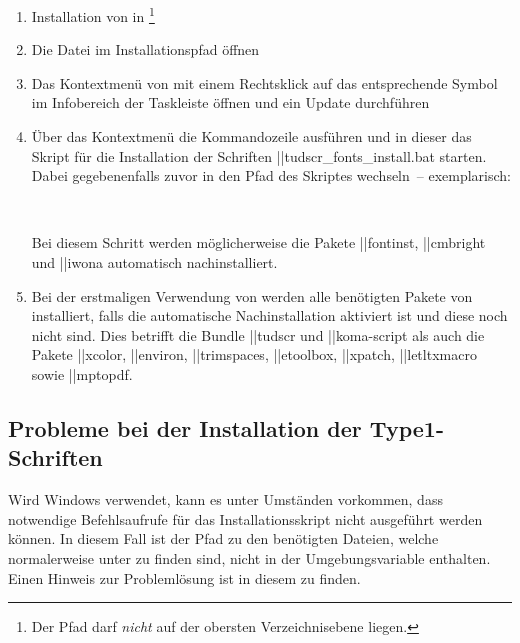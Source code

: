 %
\begin{enumerate}
\item Installation von  in 
  \footnote{Der Pfad darf \emph{nicht} auf der obersten Verzeichnisebene 
   liegen.
  }
\item Die Datei  im Installationspfad öffnen
\item Das Kontextmenü von  mit einem 
  Rechtsklick auf das entsprechende Symbol im Infobereich der Taskleiste öffnen 
  und ein Update durchführen
\item Über das Kontextmenü die Kommandozeile ausführen und in dieser das Skript 
  für die Installation der Schriften \File||{tudscr_fonts_install.bat} starten.
  Dabei gegebenenfalls zuvor in den Pfad des Skriptes wechseln~-- exemplarisch:
  \begin{quoting}[leftmargin=1.5em,rightmargin=0pt]
  \newline
  \,
  \end{quoting}
  Bei diesem Schritt werden möglicherweise die Pakete \Package||{fontinst}, 
  \Package||{cmbright} und \Package||{iwona} automatisch nachinstalliert.
\item Bei der erstmaligen Verwendung von \TUDScript werden alle benötigten 
  Pakete von  installiert, falls die 
  automatische Nachinstallation aktiviert ist und diese noch nicht sind. Dies 
  betrifft die Bundle \Bundle||{tudscr} und \Bundle||{koma-script} als auch die 
  Pakete \Package||{xcolor}, \Package||{environ}, \Package||{trimspaces}, 
  \Package||{etoolbox}, \Package||{xpatch}, \Package||{letltxmacro} sowie 
  \Package||{mptopdf}.
\end{enumerate}



\subsection{Probleme bei der Installation der Type1-Schriften}
%
Wird Windows verwendet, kann es unter Umständen vorkommen, dass notwendige 
Befehlsaufrufe für das Installationsskript nicht ausgeführt werden können. In 
diesem Fall ist der Pfad zu den benötigten Dateien, welche normalerweise unter 
 zu finden sind, nicht in der 
Umgebungsvariable  enthalten. Einen Hinweis zur Problemlösung ist 
in diesem  zu finden.

